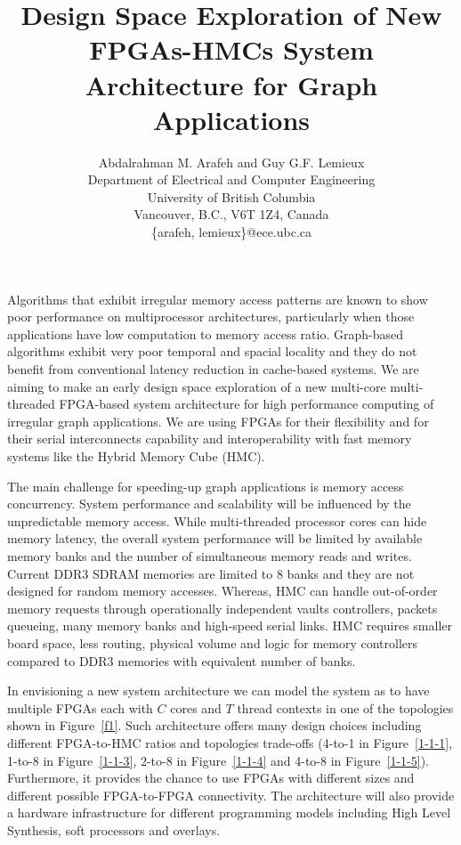 \documentclass[11pt,twocolumn]{article}
\begin{document}
\title{\textbf{Design Space Exploration of New FPGAs-HMCs System Architecture for Graph Applications}}

\author{\large Abdalrahman M. Arafeh and Guy G.F. Lemieux \\
Department of Electrical and Computer Engineering\\
University of British Columbia \\ Vancouver, B.C., V6T 1Z4, Canada \\
\{arafeh, lemieux\}@ece.ubc.ca}

\date{\vspace{-4ex}}


\maketitle

Algorithms that exhibit irregular memory access patterns are known
to show poor performance on multiprocessor architectures,
particularly when those applications have low computation to
memory access ratio. Graph-based algorithms exhibit very poor
temporal and spacial locality and they do not benefit from
conventional latency reduction in cache-based systems. We are
aiming to make an early design space exploration of a new
multi-core multi-threaded FPGA-based system architecture for high
performance computing of irregular graph applications. We are
using FPGAs for their flexibility and for their serial
interconnects capability and interoperability with fast memory
systems like the Hybrid Memory Cube (HMC).

The main challenge for speeding-up graph applications is memory
access concurrency. System performance and scalability will be
influenced by the unpredictable memory access. While
multi-threaded processor cores can hide memory latency, the
overall system performance will be limited by available memory
banks and the number of simultaneous memory reads and writes.
Current DDR3 SDRAM memories are limited to 8 banks and they are
not designed for random memory accesses. Whereas, HMC can handle
out-of-order memory requests through operationally independent
vaults controllers, packets queueing, many memory banks and
high-speed serial links. HMC requires smaller board space, less
routing, physical volume and logic for memory controllers compared
to DDR3 memories with equivalent number of banks.

In envisioning a new system architecture we can model the system
as to have multiple FPGAs each with $C$ cores and $T$ thread
contexts in one of the topologies shown in Figure~\ref{f1}. Such
architecture offers many design choices including different
FPGA-to-HMC ratios and topologies trade-offs (4-to-1 in
Figure~\ref{1-1-1}, 1-to-8 in Figure~\ref{1-1-3}, 2-to-8 in
Figure~\ref{1-1-4} and 4-to-8 in Figure~\ref{1-1-5}). Furthermore,
it provides the chance to use FPGAs with different sizes and
different possible FPGA-to-FPGA connectivity. The architecture
will also provide a hardware infrastructure for different
programming models including High Level Synthesis, soft processors
and overlays.
\end{document}
